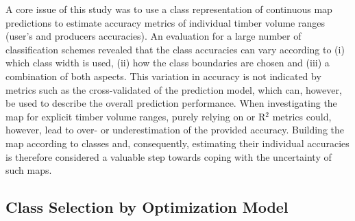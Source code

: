 A core issue of this study was to use a class representation of continuous map predictions to estimate accuracy metrics of individual timber volume ranges (user's and producers accuracies). An evaluation for a large number of classification schemes revealed that the class accuracies can vary according to (i) which class width is used, (ii) how the class boundaries are chosen and (iii) a combination of both aspects. This variation in accuracy is not indicated by metrics such as the cross-validated \rmsecv{} of the prediction model, which can, however, be used to describe the overall prediction performance. When investigating the map for explicit timber volume ranges, purely relying on \rmsecv{} or R$^2$ metrics could, however, lead to over- or underestimation of the provided accuracy. Building the map according to classes and, consequently, estimating their individual accuracies is therefore considered a valuable step towards coping with the uncertainty of such maps.

\subsection{Class Selection by Optimization Model}
\label{sec:cspmod}

